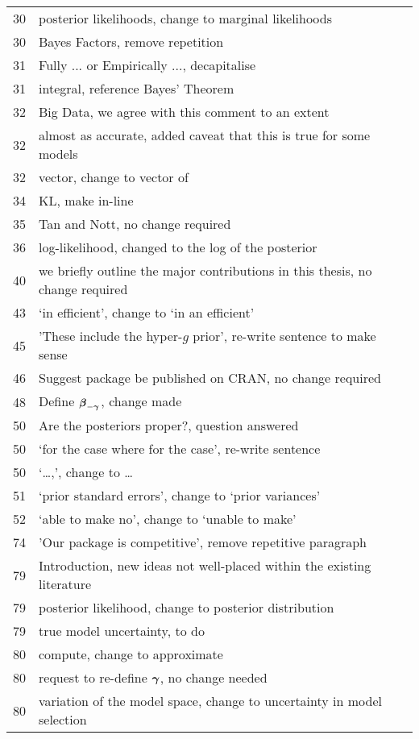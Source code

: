 \documentclass{amsart}
\begin{document}
\begin{tabular}{cl}
 30  &  posterior likelihoods, change to marginal likelihoods \\
 30  &  Bayes Factors, remove repetition\\
 31  &  Fully ... or Empirically ..., decapitalise\\
 31  &  integral, reference Bayes' Theorem\\
 32  &  Big Data, we agree with this comment to an extent\\
 32  &  almost as accurate, added caveat that this is true for some models\\
 32  &  vector, change to vector of\\
 34  &  KL, make in-line\\
 35  &  Tan and Nott, no change required\\
 36  &  log-likelihood, changed to the log of the posterior\\
 40  &  we briefly outline the major contributions in this thesis, no
			change required\\
 43	& `in efficient', change to `in an efficient' \\
 45 & 'These include the hyper-$g$ prior', re-write sentence to make sense \\
 46 & Suggest package be published on CRAN, no change required \\
 48 & Define ${\boldsymbol \beta}_{-{\boldsymbol \gamma}}$, change made \\
 50 & Are the posteriors proper?, question answered \\
 50 & `for the case where for the case', re-write sentence \\
 50 & `\ldots,', change to \ldots \\
 51 & `prior standard errors', change to `prior variances' \\
 52 & `able to make no', change to `unable to make' \\
 74 & 'Our package is competitive', remove repetitive paragraph \\
 79  &  Introduction, new ideas not well-placed within the existing
			literature\\
 79  &  posterior likelihood, change to posterior distribution\\
 79  &  true model uncertainty, to do\\
 80  &  compute, change to approximate\\
 80  &  request to re-define ${\boldsymbol \gamma}$, no change needed\\
 80  &  variation of the model space, change to uncertainty in model
			selection\\

\end{tabular}
\end{document}
